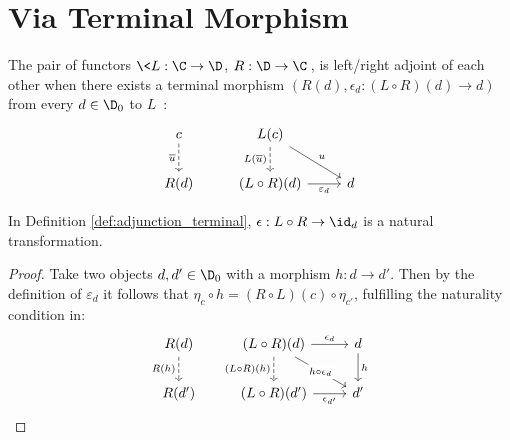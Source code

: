 \section{Via Terminal Morphism}

\begin{definition}[Adjunction]\label{def:adjunction_terminal}

  The pair of functors $\<L: \C\to \D$, $R: \D\to \C\>$, is left/right adjoint
  of each other when there exists a terminal morphism $(R(d), \epsilon_d:
  (L\circ R)(d) \to d)$ from every $d\in \D_0$ to
  $L$~\parencite[p.~214]{awodey:category_theory}:
  \[\begin{tikzcd}[ampersand replacement=\&]
    c \& {L(c)} \\
    {R(d)} \& {(L\circ R)(d)} \& d
    \arrow["{\overline{u}}"', dashed, from=1-1, to=2-1]
    \arrow["{L(\overline{u})}"', dashed, from=1-2, to=2-2]
    \arrow["{\varepsilon_d}"', from=2-2, to=2-3]
    \arrow["u", from=1-2, to=2-3]
  \end{tikzcd}\]
\end{definition}

\begin{theorem}
  In Definition \ref{def:adjunction_terminal}, $\epsilon: L\circ R \to \id_d$
  is a natural transformation.

  \begin{proof}
    Take two objects $d,d'\in \D_0$ with a morphism $h:d\to d'$. Then by the
    definition of $\varepsilon_{d}$ it follows that $\eta_c\circ h = (R\circ
    L)(c)\circ \eta_{c'}$, fulfilling the naturality condition in:
    \[\begin{tikzcd}[ampersand replacement=\&]
      {R(d)} \& {(L\circ R)(d)} \& d \\
      {R(d')} \& {(L\circ R)(d')} \& {d'}
      \arrow["h", from=1-3, to=2-3]
      \arrow["{R(h)}"', dashed, from=1-1, to=2-1]
      \arrow["{\epsilon_d}", from=1-2, to=1-3]
      \arrow["{\epsilon_{d'}}"', from=2-2, to=2-3]
      \arrow["{h\circ\epsilon_d}"{description}, from=1-2, to=2-3]
      \arrow["{(L\circ R)(h)}"', dashed, from=1-2, to=2-2]
    \end{tikzcd}\]
  \end{proof}
\end{theorem}

